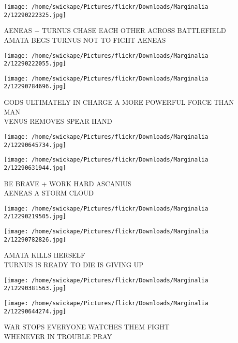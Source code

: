 \documentclass[10pt,letterpaper]{article}
\begin{document}
\vspace{0.25in}
\texttt{[image: /home/swickape/Pictures/flickr/Downloads/Marginalia 2/12290222325.jpg]}

AENEAS + TURNUS CHASE EACH OTHER ACROSS BATTLEFIELD\\
AMATA BEGS TURNUS NOT TO FIGHT AENEAS\\
\pagebreak

\texttt{[image: /home/swickape/Pictures/flickr/Downloads/Marginalia 2/12290222055.jpg]}

\vspace{0.25in}
\texttt{[image: /home/swickape/Pictures/flickr/Downloads/Marginalia 2/12290784696.jpg]}

GODS ULTIMATELY IN CHARGE A MORE POWERFUL FORCE THAN MAN\\
VENUS REMOVES SPEAR HAND\\
\pagebreak

\texttt{[image: /home/swickape/Pictures/flickr/Downloads/Marginalia 2/12290645734.jpg]}

\vspace{0.25in}
\texttt{[image: /home/swickape/Pictures/flickr/Downloads/Marginalia 2/12290631944.jpg]}

BE BRAVE + WORK HARD ASCANIUS\\
AENEAS A STORM CLOUD\\
\pagebreak

\texttt{[image: /home/swickape/Pictures/flickr/Downloads/Marginalia 2/12290219505.jpg]}

\vspace{0.25in}
\texttt{[image: /home/swickape/Pictures/flickr/Downloads/Marginalia 2/12290782826.jpg]}

AMATA KILLS HERSELF\\
TURNUS IS READY TO DIE IS GIVING UP\\
\pagebreak

\texttt{[image: /home/swickape/Pictures/flickr/Downloads/Marginalia 2/12290381563.jpg]}

\vspace{0.25in}
\texttt{[image: /home/swickape/Pictures/flickr/Downloads/Marginalia 2/12290644274.jpg]}

WAR STOPS EVERYONE WATCHES THEM FIGHT\\
WHENEVER IN TROUBLE PRAY\\
\pagebreak
\end{document}
